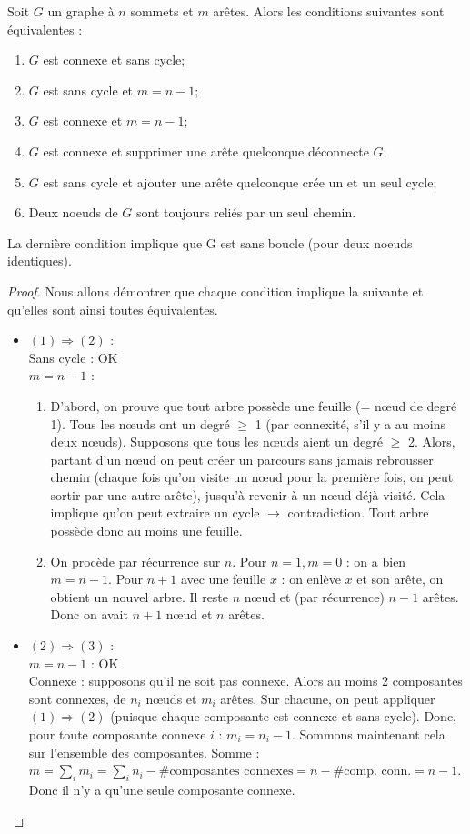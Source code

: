 \begin{mytheo} 
  Soit $G$ un graphe à $n$ sommets et $m$ arêtes. Alors les conditions suivantes sont équivalentes :
  \begin{enumerate}
    \item $G$ est connexe et sans cycle;
    \item $G$ est sans cycle et $m = n − 1$;
    \item $G$ est connexe et $m = n − 1$;
    \item $G$ est connexe et supprimer une arête quelconque déconnecte $G$;
    \item $G$ est sans cycle et ajouter une arête quelconque crée un et un seul cycle;
    \item Deux noeuds de $G$ sont toujours reliés par un seul chemin.
  \end{enumerate}
  La dernière condition implique que G est sans boucle (pour deux noeuds identiques).
  \begin{proof}
  Nous allons démontrer que chaque condition implique la suivante et qu'elles sont ainsi toutes équivalentes.
  \begin{itemize}
  \item $(1) \Rightarrow (2)$ :\\
  Sans cycle : OK\\
  $m = n-1$ :
  \begin{enumerate}[$\bullet$]
  \item D'abord, on prouve que tout arbre possède une feuille (= nœud de degré 1). Tous les nœuds ont un degré $\geq$ 1 (par connexité, s'il y a au moins deux nœuds). Supposons que tous les nœuds aient un degré $\geq$ 2. Alors, partant d'un nœud on peut créer un parcours sans jamais rebrousser chemin (chaque fois qu'on visite un nœud pour la première fois, on peut sortir par une autre arête), jusqu'à revenir à un nœud déjà visité. Cela implique qu'on peut extraire un cycle $\rightarrow$ contradiction. Tout arbre possède donc au moins une feuille.
  \item On procède par récurrence sur $n$. Pour $n=1, m=0$ : on a bien $m = n − 1$. Pour $n+1$ avec une feuille $x$ : on enlève $x$ et son arête, on obtient un nouvel arbre. Il reste $n$ nœud et (par récurrence) $n-1$ arêtes. Donc on avait $n+1$ nœud et $n$ arêtes.
  \end{enumerate}

  \item $(2) \Rightarrow (3)$ :\\
  $m = n-1$ : OK\\
  Connexe : supposons qu'il ne soit pas connexe. Alors au moins 2 composantes sont connexes, de $n_i$ nœuds et $m_i$ arêtes. Sur chacune, on peut appliquer $(1) \Rightarrow (2)$ (puisque chaque composante est connexe et sans cycle). Donc, pour toute composante connexe $i$ : $m_i = n_i -1$. Sommons maintenant cela sur l'ensemble des composantes. Somme : $m = \sum_i m_i = \sum_i n_i - \# \text{composantes connexes} = n - \# \text{comp. conn.} = n - 1$. Donc il n'y a qu'une seule composante connexe.


\end{itemize}
\end{proof}
\end{mytheo}
